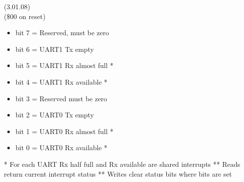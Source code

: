  (3.01.08)\\
(\$00 on reset)
\begin{itemize}
\item bit 7 = Reserved, must be zero
\item bit 6 = UART1 Tx empty
\item bit 5 = UART1 Rx almost full *
\item bit 4 = UART1 Rx available *
\item bit 3 = Reserved must be zero
\item bit 2 = UART0 Tx empty
\item bit 1 = UART0 Rx almost full *
\item bit 0 = UART0 Rx available *
\end{itemize}
* For each UART Rx half full and Rx available are shared interrupts
** Reads return current interrupt status
** Writes clear status bits where bits are set



